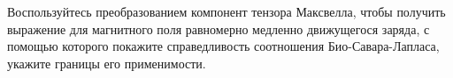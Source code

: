 \documentclass[__main__.tex]{subfiles}
\begin{document}
Воспользуйтесь преобразованием компонент тензора Максвелла, чтобы получить выражение для магнитного поля равномерно медленно движущегося заряда, с помощью которого покажите справедливость соотношения Био-Савара-Лапласа, укажите границы его применимости.\\ 

\end{document}
